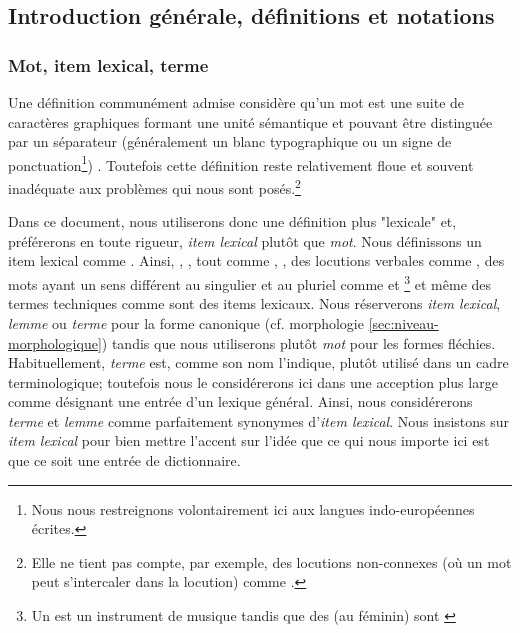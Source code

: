 \subsection{Introduction générale, définitions et notations }
\subsubsection{Mot, item lexical, terme}
\label{sec:mot}

Une définition communément admise considère qu'un mot est une suite de
caractères graphiques formant une unité sémantique et pouvant être
distinguée par un séparateur (généralement un blanc typographique ou
un signe de ponctuation\footnote{Nous nous restreignons volontairement
  ici aux langues indo-européennes écrites.}) \cite{Larousse2004}
\cite{Robert2000}.  Toutefois cette définition reste relativement
floue et souvent inadéquate aux problèmes qui nous sont posés.\footnote{
Elle ne tient pas compte, par exemple, des locutions
non-connexes (où un mot peut s'intercaler dans la locution) comme .}

Dans ce document, nous utiliserons donc une définition plus "lexicale" et, préférerons en toute
rigueur, \emph{item lexical} plutôt que \emph{mot}. Nous définissons
un item lexical comme .
Ainsi, , ,  tout comme
, , des locutions
verbales comme , des mots ayant
un sens différent au singulier et au pluriel comme  et
\footnote{Un  est un instrument de
  musique tandis que des  (au féminin) sont   \cite{Larousse2004}} et même des
termes techniques comme 
sont des items lexicaux. Nous réserverons \emph{item lexical}, \emph{lemme} ou
\emph{terme} pour la forme canonique (cf. morphologie
\ref{sec:niveau-morphologique}) tandis que nous utiliserons plutôt
\emph{mot} pour les formes fléchies. Habituellement, \emph{terme} est,
comme son nom l'indique, plutôt utilisé dans un cadre terminologique;
toutefois nous le considérerons ici dans une acception plus
large comme désignant une entrée d'un lexique général.  Ainsi, nous
considérerons \emph{terme} et \emph{lemme} comme parfaitement synonymes
d'\emph{item lexical}. Nous insistons sur \emph{item lexical} pour
bien mettre l'accent sur l'idée que ce qui nous importe ici est que ce
soit une entrée de dictionnaire.

